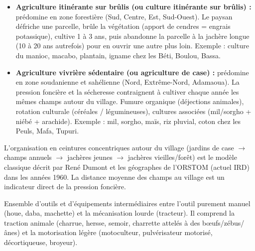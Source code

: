 \documentclass[11pt]{article}
\newcommand{\cle}[1]{{\popxbold\color{popdark}#1}}
\newcounter{popsec}
\newcounter{popsub}
\newcommand{\courssub}[1]{%
  \stepcounter{popsub}%
  \par\vspace{9pt}\noindent{\popxbold\fontsize{11.5}{13}\selectfont\color{popink}{\color{poporange}\thepopsec.\thepopsub}\hspace{6pt}#1}\par\nopagebreak\vspace{4pt}
}
\begin{document}
\begin{propriete}
\begin{itemize}
\item \textbf{Agriculture itinérante sur brûlis (ou culture itinérante sur brûlis) :} prédomine en zone forestière (Sud, Centre, Est, Sud-Ouest). Le paysan défriche une parcelle, brûle la végétation (apport de cendres = engrais potassique), cultive 1 à 3 ans, puis abandonne la parcelle à la jachère longue (10 à 20 ans autrefois) pour en ouvrir une autre plus loin. Exemple : culture du manioc, macabo, plantain, igname chez les Béti, Boulou, Bassa.
\item \textbf{Agriculture vivrière sédentaire (ou agriculture de case) :} prédomine en zone soudanienne et sahélienne (Nord, Extrême-Nord, Adamaoua). La pression foncière et la sécheresse contraignent à cultiver chaque année les mêmes champs autour du village. Fumure organique (déjections animales), rotation culturale (céréales / légumineuses), cultures associées (mil/sorgho + niébé + arachide). Exemple : mil, sorgho, maïs, riz pluvial, coton chez les Peuls, Mafa, Tupuri.
\end{itemize}
\end{propriete}

\begin{savaistu}
L'organisation en ceintures concentriques autour du village (jardins de case $\rightarrow$ champs annuels $\rightarrow$ jachères jeunes $\rightarrow$ jachères vieilles/forêt) est le modèle classique décrit par René Dumont et les géographes de l'ORSTOM (actuel IRD) dans les années 1960. La distance moyenne des champs au village est un indicateur direct de la pression foncière.
\end{savaistu}

\courssub{Un outillage amélioré}

\begin{definition}
Ensemble d'outils et d'équipements intermédiaires entre l'outil purement manuel (houe, daba, machette) et la mécanisation lourde (tracteur). Il comprend la \cle{traction animale} (charrue, hersse, semoir, charrette attelés à des bœufs/zébus/ânes) et la \cle{motorisation légère} (motoculteur, pulvérisateur motorisé, décortiqueuse, broyeur).
\end{definition}
\end{document}
